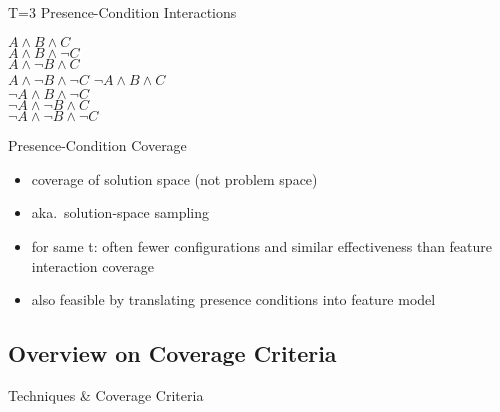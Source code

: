 \begin{frame}{\myframetitle{} }
\begin{fancycolumns}[widths={48}]
\begin{example}{{T=3 Presence-Condition Interactions}}
			\begin{fancycolumns}[animation=none]
				$A \wedge B \wedge C$\\
				$A \wedge B \wedge \neg C$\\
				$A \wedge \neg B \wedge C$\\
				$A \wedge \neg B \wedge \neg C$
			\nextcolumn
				$\neg A \wedge B \wedge C$\\
				$\neg A \wedge B \wedge \neg C$\\
				$\neg A \wedge \neg B \wedge C$\\
				$\neg A \wedge \neg B \wedge \neg C$
			\end{fancycolumns}
		\end{example}
		\pause
		\begin{note}{Presence-Condition Coverage\mysource{\krieterpresenceconditioncoverage}}
			\begin{itemize}
				\item coverage of solution space (not problem space)
				\item aka.\ solution-space sampling
				\item for same t: often fewer configurations and similar effectiveness than feature interaction coverage
				\item also feasible by translating presence conditions into feature model \mysource{\hentzesolutionspacesampling}
			\end{itemize}
		\end{note}
	\end{fancycolumns}
\end{frame}

\subsection{Overview on Coverage Criteria}
\begin{frame}{\myframetitle{} }
	\begin{definition}{Techniques \& Coverage Criteria \mysource{\samplingsurvey}}
	\end{definition}
\end{frame}

